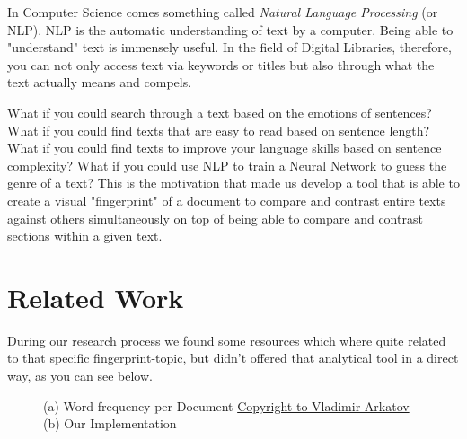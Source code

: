 \documentclass[runningheads]{llncs}
\begin{document}
In Computer Science comes something called \textit{Natural Language Processing} (or NLP). NLP is the automatic understanding of text by a computer. Being able to "understand" text is immensely useful. In the field of Digital Libraries, therefore, you can not only access text via keywords or titles but also through what the text actually means and compels.

What if you could search through a text based on the emotions of sentences? What if you could find texts that are easy to read based on sentence length? What if you could find texts to improve your language skills based on sentence complexity? What if you could use NLP to train a Neural Network to guess the genre of a text? This is the motivation that made us develop a tool that is able to create a visual "fingerprint" of a document to compare and contrast entire texts against others simultaneously on top of being able to compare and contrast sections within a given text.

\section{Related Work}
During our research process we found some resources which where quite related to that specific fingerprint-topic, but didn't offered that analytical tool in a direct way, as you can see below.

\begin{figure}
    \centering
    \caption{(a) Word frequency per Document \href{https://www.123rf.com/photo_36990141_stock-vector-infographics-with-sound-waves-on-world.html}{Copyright to Vladimir Arkatov} (b) \label{density-plot} Our Implementation}
    \label{fig:circle-digram}
\end{figure}
\end{document}
